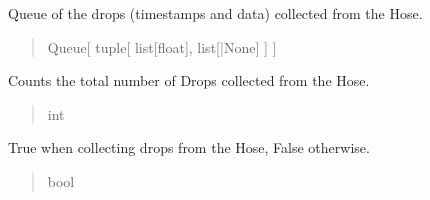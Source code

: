 \documentclass[letterpaper,10pt,english]{sphinxmanual}
\begin{document}
\begin{fulllineitems}
\begin{fulllineitems}
\label{\detokenize{Morelia.Stream.Collect:Morelia.Stream.Collect.DataBucket.Bucket.drops}}
\pysigstartsignatures
{}
\pysigstopsignatures
\sphinxAtStartPar
Queue of the drops             (timestamps and data) collected from the Hose.
\begin{quote}\begin{description}
\sphinxAtStartPar
Queue{[} tuple{[} list{[}float{]}, list{[}{\hyperref[\detokenize{Morelia.Packets:Morelia.Packets.Packet.Packet}]{}}|None{]} {]} {]}

\end{description}\end{quote}

\end{fulllineitems}


\begin{fulllineitems}
\label{\detokenize{Morelia.Stream.Collect:Morelia.Stream.Collect.DataBucket.Bucket.totalDropsCollected}}
\pysigstartsignatures
{}
\pysigstopsignatures
\sphinxAtStartPar
Counts the total number of Drops collected from the Hose.
\begin{quote}\begin{description}
\sphinxAtStartPar
int

\end{description}\end{quote}

\end{fulllineitems}


\begin{fulllineitems}
\label{\detokenize{Morelia.Stream.Collect:Morelia.Stream.Collect.DataBucket.Bucket.isCollecting}}
\pysigstartsignatures
{}
\pysigstopsignatures
\sphinxAtStartPar
True when collecting drops from the Hose, False otherwise.
\begin{quote}\begin{description}
\sphinxAtStartPar
bool


\end{description}
\end{quote}
\end{fulllineitems}
\end{fulllineitems}
\end{document}
